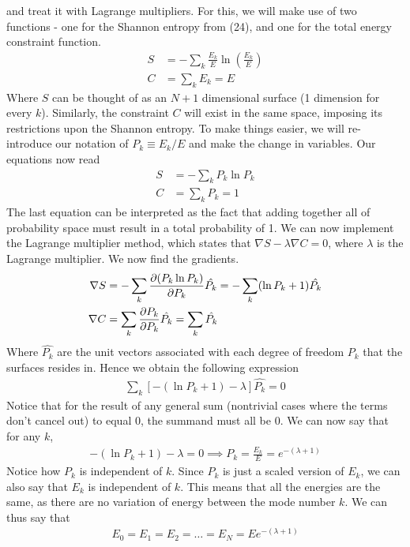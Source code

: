 \documentclass{article}
\begin{document}
 and treat it with Lagrange multipliers. For this, we will make use of two functions - 
one for the Shannon entropy from (24), and one for the total energy constraint function. 
\begin{align}
    S&=-\sum_k\frac{E_k}{E}\ln(\frac{E_k}{E})\\ 
    C&=\sum_kE_k=E
\end{align}
Where $S$ can be thought of as an $N+1$ dimensional surface (1 dimension for every $k$). 
Similarly, the constraint $C$ will exist in the same space, imposing 
its restrictions upon the Shannon entropy. 
To make things easier, we will re-introduce our notation of 
$P_k\equiv E_k/E$ and make the change in variables. Our equations now read 
\begin{align}
    S&=-\sum_kP_k\ln{P_k}\\
    C&=\sum_kP_k=1
\end{align}
The last equation can be interpreted as the fact that
 adding together all of probability space must result in a total probability of 1. 
We can now implement the Lagrange multiplier method, which states that $\nabla S-\lambda\nabla C=0$, 
where $\lambda$ is the Lagrange multiplier. We now find the gradients. 
\begin{align}
    \nabla S&=-\sum_k\pdv{(P_k\ln P_k)}{P_k}\hat{P_k}=-\sum_k(\ln P_k+1)\hat{P_k}\\ 
    \nabla C& =\sum_k\pdv{P_k}{P_k}\hat{P_k}=\sum_k\hat{P_k}
\end{align}
Where $\hat{P_k}$ are the unit vectors associated with each degree of freedom $P_k$ that the surfaces resides in. 
Hence we obtain the following expression 
\begin{align}
    \sum_k[-(\ln P_k+1)-\lambda]\hat{P_k}=0
\end{align}
Notice that for the result of any general sum (nontrivial cases where the terms don't cancel out)
 to equal 0, the summand must all be 0. We can now say that for any $k$, 
\begin{align}
    -(\ln P_k+1)-\lambda=0\implies P_k=\frac{E_k}{E}=e^{-(\lambda+1)}
\end{align}
Notice how $P_k$ is independent of $k$. Since $P_k$ is just a scaled version of $E_k$, we can 
also say that $E_k$ is independent of $k$. This means that all the energies are the same, 
as there are no variation of energy between the mode number $k$. We can thus say that 
\begin{align}
    E_0=E_1=E_2=\dots=E_N=Ee^{-(\lambda+1)}
\end{align}
\end{document}
